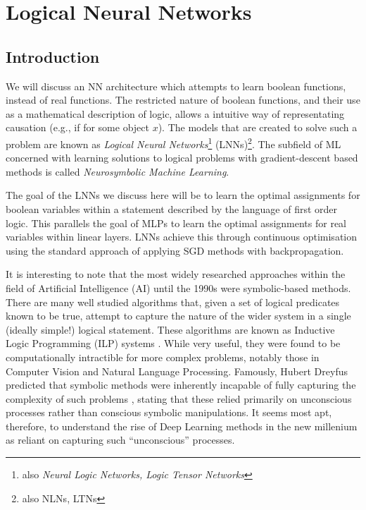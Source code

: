 
\chapter{Logical Neural Networks}
\label{section:lnns}

\section{Introduction}

We will discuss an NN architecture which attempts to learn boolean functions, instead of real functions. The restricted nature of boolean functions, and their use as a mathematical description of logic, allows a intuitive way of representating causation (e.g., if for some object $x$). The models that are created to solve such a problem are known as \textit{Logical Neural Networks}\footnote{also \textit{Neural Logic Networks, Logic Tensor Networks}} (LNNs)\footnote{also NLNs, LTNs}. The subfield of ML concerned with learning solutions to logical problems with gradient-descent based methods is called \textit{Neurosymbolic Machine Learning}.

The goal of the LNNs we discuss here will be to learn the optimal assignments for boolean variables within a statement described by the language of first order logic. This parallels the goal of MLPs to learn the optimal assignments for real variables within linear layers. LNNs achieve this through continuous optimisation using the standard approach of applying SGD methods with backpropagation. 

It is interesting to note that the most widely researched approaches within the field of Artificial Intelligence (AI) until the 1990s were symbolic-based methods. There are many well studied algorithms that, given a set of logical predicates known to be true, attempt to capture the nature of the wider system in a single (ideally simple!) logical statement. These algorithms are known as Inductive Logic Programming (ILP) systems \cite{ilp}. While very useful, they were found to be computationally intractible for more complex problems, notably those in Computer Vision and Natural Language Processing. Famously, Hubert Dreyfus predicted that symbolic methods were inherently incapable of fully capturing the complexity of such problems \cite{symbolicaibad}, stating that these relied primarily on unconscious processes rather than conscious symbolic manipulations. It seems most apt, therefore, to understand the rise of Deep Learning methods in the new millenium as reliant on capturing such ``unconscious'' processes.

